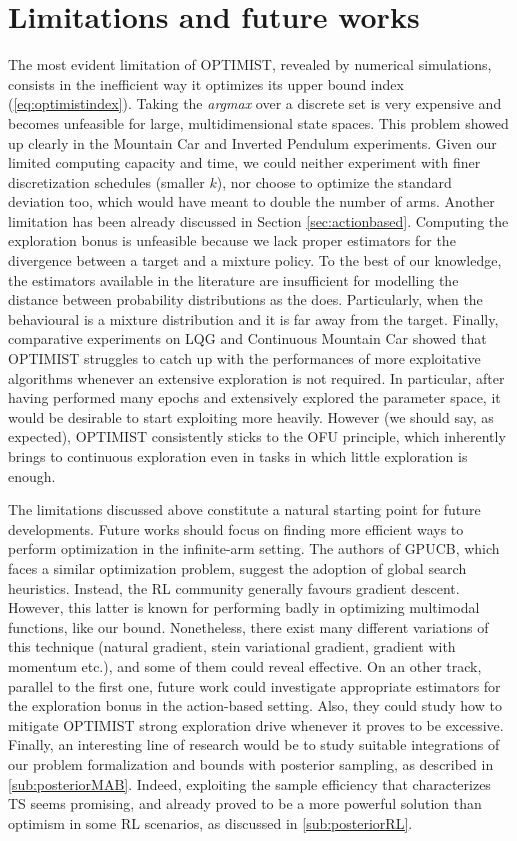 \section{Limitations and future works}
The most evident limitation of \gls{OPTIMIST}, revealed by numerical simulations, consists in the inefficient way it optimizes its upper bound index (\ref{eq:optimistindex}). Taking the \emph{argmax} over a discrete set is very expensive and becomes unfeasible for large, multidimensional state spaces. This problem showed up clearly in the Mountain Car and Inverted Pendulum experiments. Given our limited computing capacity and time, we could neither experiment with finer discretization schedules (smaller $k$), nor choose to optimize the standard deviation too, which would have meant to double the number of arms.
Another limitation has been already discussed in Section \ref{sec:actionbased}. Computing the exploration bonus is unfeasible because we lack proper estimators for the \Renyi divergence between a target and a mixture policy. To the best of our knowledge, the estimators available in the literature are insufficient for modelling the distance between probability distributions as the \Renyi does. Particularly, when the behavioural is a mixture distribution and it is far away from the target.
Finally, comparative experiments on \gls{LQG} and  Continuous Mountain Car showed that \gls{OPTIMIST} struggles to catch up with the performances of more exploitative algorithms whenever an extensive exploration is not required. In particular, after having performed many epochs and extensively explored the parameter space, it would be desirable to start exploiting more heavily. However (we should say, as expected), \gls{OPTIMIST} consistently sticks to the \gls{OFU} principle, which inherently brings to continuous exploration even in tasks in which little exploration is enough.

The limitations discussed above constitute a natural starting point for future developments.
Future works should focus on finding more efficient ways to perform optimization in
the infinite-arm setting. The authors of \gls{GPUCB}, which faces a similar optimization problem, suggest the adoption of global search heuristics. Instead, the \gls{RL} community generally favours gradient descent. However, this latter is known for performing badly in optimizing multimodal functions, like our bound. Nonetheless, there exist many different variations of this technique (natural gradient, stein variational gradient, gradient with momentum etc.), and some of them could reveal effective.
On an other track, parallel to the first one, future work could investigate appropriate estimators for the exploration bonus in the action-based setting. Also, they could study how to mitigate \gls{OPTIMIST} strong exploration drive whenever it proves to be excessive.
Finally, an interesting line of research would be to study suitable integrations of our problem formalization and bounds with posterior sampling, as described in \ref{sub:posteriorMAB}. Indeed, exploiting the sample efficiency that characterizes \gls{TS} seems promising, and already proved to be a more powerful solution than optimism in some \gls{RL} scenarios, as discussed in \ref{sub:posteriorRL}. 
